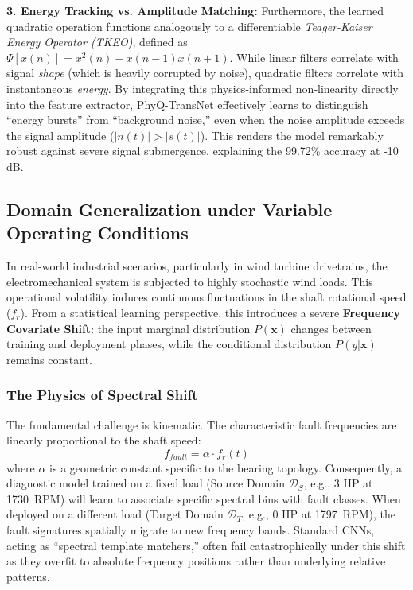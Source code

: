 \documentclass[5p,times,twocolumn]{elsarticle}
\begin{document}
\textbf{3. Energy Tracking vs. Amplitude Matching:}
Furthermore, the learned quadratic operation functions analogously to a differentiable \textit{Teager-Kaiser Energy Operator (TKEO)}, defined as $\Psi[x(n)] = x^2(n) - x(n-1)x(n+1)$. While linear filters correlate with signal \textit{shape} (which is heavily corrupted by noise), quadratic filters correlate with instantaneous \textit{energy}.
By integrating this physics-informed non-linearity directly into the feature extractor, PhyQ-TransNet effectively learns to distinguish ``energy bursts'' from ``background noise,'' even when the noise amplitude exceeds the signal amplitude ($|n(t)| > |s(t)|$). This renders the model remarkably robust against severe signal submergence, explaining the 99.72\% accuracy at -10 dB.

\subsection{Domain Generalization under Variable Operating Conditions}
In real-world industrial scenarios, particularly in wind turbine drivetrains, the electromechanical system is subjected to highly stochastic wind loads. This operational volatility induces continuous fluctuations in the shaft rotational speed ($f_r$). From a statistical learning perspective, this introduces a severe \textbf{Frequency Covariate Shift}: the input marginal distribution $P(\mathbf{x})$ changes between training and deployment phases, while the conditional distribution $P(y|\mathbf{x})$ remains constant.

\subsubsection{The Physics of Spectral Shift}
The fundamental challenge is kinematic. The characteristic fault frequencies are linearly proportional to the shaft speed:
\begin{equation}
    f_{fault} = \alpha \cdot f_r(t)
\end{equation}
where $\alpha$ is a geometric constant specific to the bearing topology. Consequently, a diagnostic model trained on a fixed load (Source Domain $\mathcal{D}_S$, e.g., 3 HP at \SI{1730}{RPM}) will learn to associate specific spectral bins with fault classes. When deployed on a different load (Target Domain $\mathcal{D}_T$, e.g., 0 HP at \SI{1797}{RPM}), the fault signatures spatially migrate to new frequency bands. Standard CNNs, acting as ``spectral template matchers,'' often fail catastrophically under this shift as they overfit to absolute frequency positions rather than underlying relative patterns.
\end{document}
